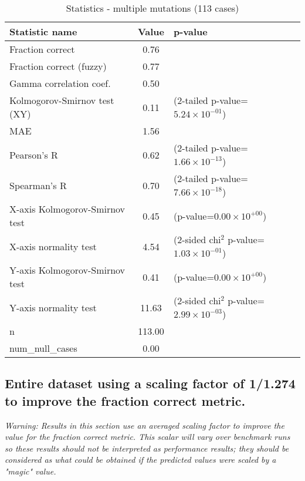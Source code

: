 \documentclass[10pt, letterpaper, oneside, titlepage, landscape]{scrreprt}
\begin{document}
\begin{table}[H]\begin{center}
\begin{tabular}{ l S[table-format=3.2] l}
Statistic name & {Value} & p-value\\
\hline
Fraction correct & 0.76 & \\
Fraction correct (fuzzy) & 0.77 & \\
Gamma correlation coef. & 0.50 & \\
Kolmogorov-Smirnov test (XY) & 0.11 & (2-tailed p-value=$5.24\times10^{-01}$)\\
MAE & 1.56 & \\
Pearson's R & 0.62 & (2-tailed p-value=$1.66\times10^{-13}$)\\
Spearman's R & 0.70 & (2-tailed p-value=$7.66\times10^{-18}$)\\
X-axis Kolmogorov-Smirnov test & 0.45 & (p-value=$0.00\times10^{+00}$)\\
X-axis normality test & 4.54 & (2-sided chi$^{2}$ p-value=$1.03\times10^{-01}$)\\
Y-axis Kolmogorov-Smirnov test & 0.41 & (p-value=$0.00\times10^{+00}$)\\
Y-axis normality test & 11.63 & (2-sided chi$^{2}$ p-value=$2.99\times10^{-03}$)\\
n & 113.00 & \\
num\_null\_cases & 0.00 & \\
\end{tabular}
\caption{Statistics - multiple mutations (113 cases)}
\end{center}\end{table}


\subsection{Entire dataset using a scaling factor of 1/1.274 to improve the fraction correct metric.}
\textit{Warning: Results in this section use an averaged scaling factor to improve the value for the fraction correct metric. This scalar will vary over benchmark runs so these results should not be interpreted as performance results; they should be considered as what could be obtained if the predicted values were scaled by a "magic" value.}
\end{document}
